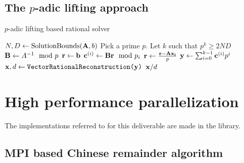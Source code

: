 \subsection{The $p$-adic lifting approach}

\begin{algorithm}
  \caption{$p$-adic lifting based rational solver}
  \begin{algorithmic}[1]
    \State $N,D \leftarrow \text{SolutionBounds}(\mathbf{A},b)$
    \State Pick a prime $p$. Let $k$ such that $p^k \geq 2ND$
    \State $\mathbf{B}\leftarrow A^{-1} \mod p$
    \State $\mathbf{r}\leftarrow \mathbf{b}$
    \State $\mathbf{c}^{(i)}  \leftarrow \mathbf{B} \mathbf{r} \mod p_i$
    \State $\mathbf{r} \leftarrow  \frac{\mathbf{r} - \mathbf{A}\mathbf{x_i}}{p}$
    \EndFor
    \State $\mathbf{y} \leftarrow \sum_{i=0}^{k-1} \mathbf{c}^{(i)} p^i$
    \State $\mathbf{x},d\leftarrow \texttt{VectorRationalReconstruction(\ensuremath{\mathbf{y}})}$
  \State \Return $\mathbf{x}/d$
\end{algorithmic}
\end{algorithm}

\section{High performance parallelization}

The implementations referred to for this deliverable are made in the \Linbox library.


\subsection{MPI based Chinese remainder algorithm}


